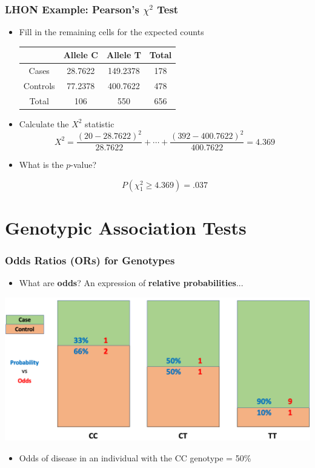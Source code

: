 \documentclass{beamer}
\begin{document}
\begin{frame}
\frametitle{\bf LHON Example: Pearson's $\chi^2$ Test }
 \begin{itemize}
\item<1-> Fill in the remaining cells for the expected counts
  \begin{center}
      \begin{tabular}{|c|cc|c|}
        \hline
         & Allele C  &  Allele T& Total\\
\hline
Cases & 28.7622 & 149.2378 & 178   \\
Controls &77.2378& 400.7622  &478 \\
\hline
Total& 106&550& 656 \\
\hline
      \end{tabular}
    \end{center}
\item<2-> Calculate the $X^2$ statistic
 \[X^2=\frac{(20-28.7622)^2}{28.7622}+\cdots+\frac{(392-400.7622 )^2}{400.7622 }=4.369\]
\item<3-> What is the $p$-value?

\[ P(\chi ^2_{1} \ge 4.369)=.037 \]
\end{itemize}
\end{frame}

\section{Genotypic Association Tests}



\begin{frame}
\frametitle{\bf Odds Ratios (ORs) for Genotypes}
\begin{itemize}
\item What are \textbf{odds}? An expression of \textbf{relative probabilities}...
\end{itemize}
\centering	\includegraphics[scale=.35]{Figures/odds_plot1.png}
\vspace{-1em}
\begin{itemize}
	\item Odds of disease in an individual with the CC genotype = 50\%
\end{itemize}
\end{frame}
\end{document}
